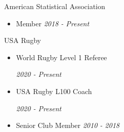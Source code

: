 
\Affiliation
{American Statistical Association}
{\begin{itemize}
   \item Member \hfill \emph{2018 - Present}
\end{itemize}}


\Affiliation
{USA Rugby}
{\begin{itemize}
   \item World Rugby Level 1 Referee \newline \strut\hfill \emph{2020 - Present}
   \item USA Rugby L100 Coach \newline \strut\hfill \emph{2020 - Present}
   \item Senior Club Member \hfill \emph{2010 - 2018}
\end{itemize}}

